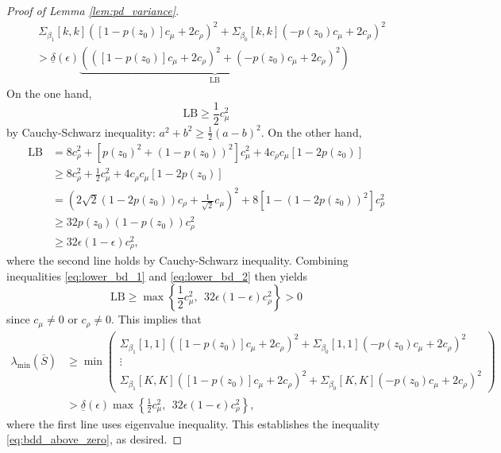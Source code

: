\documentclass[11pt]{article}
\theoremstyle{definition}
\newcommand{\0}{\ensuremath{\mathbf{0}}}
\begin{document}
\begin{bibunit}
\begin{proof}[Proof of Lemma \ref{lem:pd_variance}]
\begin{align*}
    & ~ \Sigma_{\beta_1}[k,k]([1 - p(z_0)]c_\mu + 2c_\rho)^2 + \Sigma_{\beta_0}[k,k](- p(z_0)c_\mu + 2c_\rho)^2 \\
    & > \underline{\delta}(\epsilon) \underbrace{\left(([1-p(z_0)]c_\mu + 2c_\rho)^2 + (-p(z_0)c_\mu + 2c_\rho)^2\right)}_{\text{LB}} 
\end{align*}
On the one hand, 
\begin{equation}
\label{eq:lower_bd_1}
    \text{LB} \geq \frac{1}{2} c_\mu^2 
\end{equation}
by Cauchy-Schwarz inequality: $a^2 + b^2 \geq \frac{1}{2}(a-b)^2$. On the other hand,
\begin{equation}
\label{eq:lower_bd_2}
\begin{aligned}
    \text{LB} 
    &= 8c_\rho^2+ \left[p(z_0)^2 + (1-p(z_0))^2\right]c_\mu^2 + 4c_\rho c_\mu[1-2p(z_0)] \\
    &\geq 8c_\rho^2+ \frac{1}{2} c_\mu^2 + 4c_\rho c_\mu[1-2p(z_0)] \\
    &= \left(2\sqrt{2}(1-2p(z_0))c_\rho + \frac{1}{\sqrt{2}}c_\mu\right)^2 + 8\left[1-(1-2p(z_0))^2\right]c_\rho^2 \\
    &\geq 32 p(z_0)\left(1 - p(z_0)\right)c_\rho^2 \\
    &\geq 32\epsilon(1-\epsilon) c_\rho^2,
\end{aligned}
\end{equation}
where the second line holds by Cauchy-Schwarz inequality. 
Combining inequalities \eqref{eq:lower_bd_1} and \eqref{eq:lower_bd_2} then yields
\[
    \text{LB} \geq \max\left\{\frac{1}{2}c_\mu^2, ~~32\epsilon(1-\epsilon)c_\rho^2\right\} > 0
\]
since $c_\mu \neq 0$ or $c_\rho \neq 0$. This implies that
\begin{align*}
\lambda_{\min}(\bar{S}) 
    &\geq 
    \min
    \begin{pmatrix}
        \Sigma_{\beta_1}[1,1]([1 - p(z_0)]c_\mu + 2c_\rho)^2 + \Sigma_{\beta_0}[1,1](- p(z_0)c_\mu + 2c_\rho)^2 \\
        \vdots \\
        \Sigma_{\beta_1}[K,K]([1 - p(z_0)]c_\mu + 2c_\rho)^2 +
        \Sigma_{\beta_0}[K,K](- p(z_0)c_\mu + 2c_\rho)^2
    \end{pmatrix} \\
    &>
    \underline{\delta}(\epsilon) \max\left\{\frac{1}{2}c_\mu^2, ~~32\epsilon(1-\epsilon)c_\rho^2\right\},    
\end{align*}
where the first line uses eigenvalue inequality. 
This establishes the inequality \eqref{eq:bdd_above_zero}, as desired. 


\end{proof}
\end{bibunit}
\end{document}
